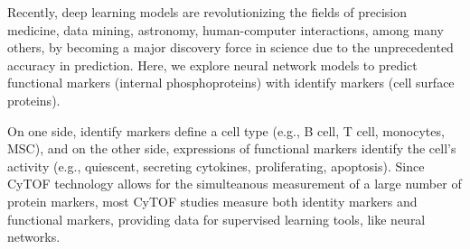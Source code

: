 \documentclass[graybox]{svmult}
\begin{document}
Recently, deep learning models are revolutionizing the fields of
precision medicine, data mining, astronomy, human-computer
interactions, among many others, by becoming a major discovery force
in science due to the unprecedented accuracy in prediction.  Here, we
explore neural network models to predict functional markers (internal
phosphoproteins) with identify markers (cell surface proteins).

On one side, identify markers define a cell type (e.g., B cell, T
cell, monocytes, MSC), and on the other side, expressions of
functional markers identify the cell's activity (e.g., quiescent,
secreting cytokines, proliferating, apoptosis). Since CyTOF technology
allows for the simulteanous measurement of a large number of protein
markers, most CyTOF studies measure both identity markers and
functional markers, providing data for supervised learning tools, like
neural networks.
\end{document}
